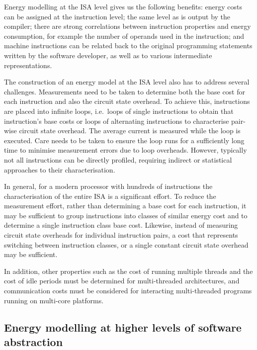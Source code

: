 Energy modelling at the ISA level gives us the following benefits: energy
costs can be assigned at the instruction level; the same level as is output by
the compiler; there are strong correlations between instruction properties and
energy consumption, for example the number of operands used in the instruction;
and machine instructions can be related back to the original programming
statements written by the software developer, as well as to various
intermediate representations. 

The construction of an energy model at the ISA level also has to address several
challenges.
%
Measurements need to be taken to determine both the base cost for each
instruction and also the circuit state overhead. To achieve this, instructions
are placed into infinite loops, i.e.\ loops of single instructions to obtain
that instruction's base costs or loops of alternating instructions to
characterise pair-wise circuit state overhead. The average current is measured
while the loop is executed. Care needs to be taken to ensure the loop runs for
a sufficiently long time to minimise measurement errors due to loop overheads.
%
However, typically not all instructions can be directly profiled, requiring
indirect or statistical approaches to their characterisation.

In general, for a modern processor with hundreds of instructions the
characterisation of the entire ISA is a significant effort.
%
To reduce the measurement effort, rather than determining a base cost for each
instruction, it may be sufficient to group instructions into classes of similar
energy cost and to determine a single instruction class base cost. Likewise,
instead of measuring circuit state overheads for individual instruction pairs,
a cost that represents switching between instruction classes, or a single
constant circuit state overhead may be sufficient.

In addition, other properties such as the cost of running multiple threads and
the cost of idle periods must be determined for multi-threaded architectures,
and communication costs must be considered for interacting multi-threaded
programs running on multi-core platforms. 
%
 

\subsection{Energy modelling at higher levels of software abstraction}
\label{subsec:mapping}

